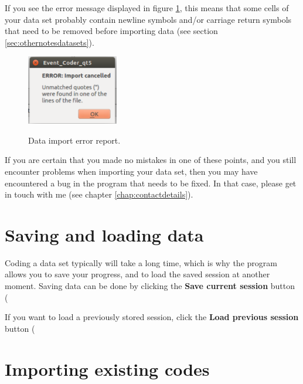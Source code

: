 \documentclass{memoir}
\begin{document}
If you see the error message displayed in figure \ref{fig:importerror}, this means that some cells of your data set probably contain newline symbols and/or carriage return symbols that need to be removed before importing data (see section \ref{sec:othernotesdatasets}).

\begin{figure}[h!]
  \centering
  \caption{Data import error report.}
  \includegraphics[width=40mm]{Screenshot_1.pdf}
  \label{fig:importerror}
\end{figure}

If you are certain that you made no mistakes in one of these points, and you still encounter problems when importing your data set, then you may have encountered a bug in the program that needs to be fixed. In that case, please get in touch with me (see chapter \ref{chap:contactdetails}).

\section{Saving and loading data}
\label{sec:savingloadingdata}

Coding a data set typically will take a long time, which is why the program allows you to save your progress, and to load the saved session at another moment. Saving data can be done by clicking the \textbf{Save current session} button (%

If you want to load a previously stored session, click the \textbf{Load previous session} button (%


\section{Importing existing codes}
\label{sec:importingcodes}
\end{document}
